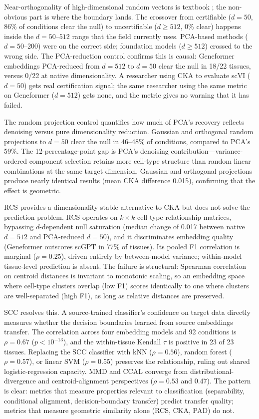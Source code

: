 \documentclass[11pt]{article}
\begin{document}
Near-orthogonality of high-dimensional random vectors is textbook
\citep{johnsonlindenstrauss1984}; the non-obvious part is where the
boundary lands. The crossover from certifiable ($d = 50$, 86\% of
conditions clear the null) to uncertifiable ($d \geq 512$, 0\% clear)
happens inside the $d = 50$--$512$ range that the field currently uses.
PCA-based methods ($d = 50$--$200$) were on the correct side; foundation
models ($d \geq 512$) crossed to the wrong side. The PCA-reduction
control confirms this is causal: Geneformer embeddings PCA-reduced from
$d = 512$ to $d = 50$ clear the null in 18/22 tissues, versus 0/22 at
native dimensionality. A researcher using CKA to evaluate scVI
($d = 50$) gets real certification signal; the same researcher using the
same metric on Geneformer ($d = 512$) gets none, and the metric gives no
warning that it has failed.

The random projection control quantifies how much of PCA's recovery
reflects denoising versus pure dimensionality reduction. Gaussian and
orthogonal random projections to $d = 50$ clear the null in 46--48\%
of conditions, compared to PCA's 59\%. The 12-percentage-point gap is
PCA's denoising contribution---variance-ordered component selection
retains more cell-type structure than random linear combinations at
the same target dimension. Gaussian and orthogonal projections produce
nearly identical results (mean CKA difference 0.015), confirming that
the effect is geometric.

RCS provides a dimensionality-stable alternative to CKA but does not
solve the prediction problem. RCS operates on $k \times k$ cell-type
relationship matrices, bypassing $d$-dependent null saturation (median
change of 0.017 between native $d = 512$ and PCA-reduced $d = 50$),
and it discriminates embedding quality (Geneformer outscores scGPT in
77\% of tissues). Its pooled F1 correlation is marginal
($\rho = 0.25$), driven entirely by between-model variance; within-model
tissue-level prediction is absent. The failure is structural: Spearman
correlation on centroid distances is invariant to monotonic scaling, so
an embedding space where cell-type clusters overlap (low F1) scores
identically to one where clusters are well-separated (high F1), as long
as relative distances are preserved.

SCC resolves this. A source-trained classifier's confidence on target
data directly measures whether the decision boundaries learned from
source embeddings transfer. The correlation across four embedding
models and 92 conditions is $\rho = 0.67$ ($p < 10^{-13}$), and the
within-tissue Kendall $\tau$ is positive in 23 of 23 tissues.
Replacing the SCC classifier with kNN ($\rho = 0.56$), random forest
($\rho = 0.57$), or linear SVM ($\rho = 0.55$) preserves the
relationship, ruling out shared logistic-regression capacity. MMD and
CCAL converge from distributional-divergence and centroid-alignment
perspectives ($\rho = 0.53$ and $0.47$). The pattern is clear:
metrics that measure properties relevant to classification
(separability, conditional alignment, decision-boundary transfer)
predict transfer quality; metrics that measure geometric similarity
alone (RCS, CKA, PAD) do not.
\end{document}
